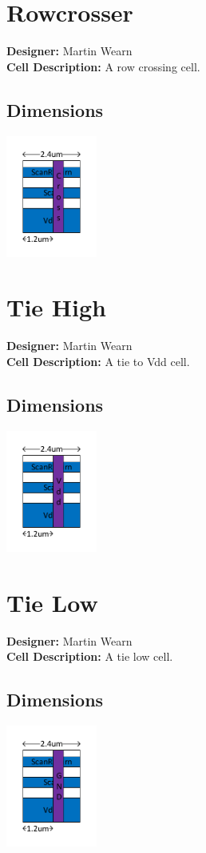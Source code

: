 \newpage
\section{Rowcrosser} %
{\bf Designer: } Martin Wearn\\
{\bf Cell Description: } A row crossing cell.\\
\subsection*{Dimensions}\includegraphics[width=\textwidth,height=4cm,keepaspectratio=true]{../rowcrosser/blackbox.pdf}

\section{Tie High} %
{\bf Designer: } Martin Wearn\\
{\bf Cell Description: } A tie to Vdd cell.\\
\subsection*{Dimensions}\includegraphics[width=\textwidth,height=4cm,keepaspectratio=true]{../tiehigh/blackbox.pdf}

\section{Tie Low} %
{\bf Designer: } Martin Wearn\\
{\bf Cell Description: } A  tie low cell.\\
\subsection*{Dimensions}\includegraphics[width=\textwidth,height=4cm,keepaspectratio=true]{../tielow/blackbox.pdf}